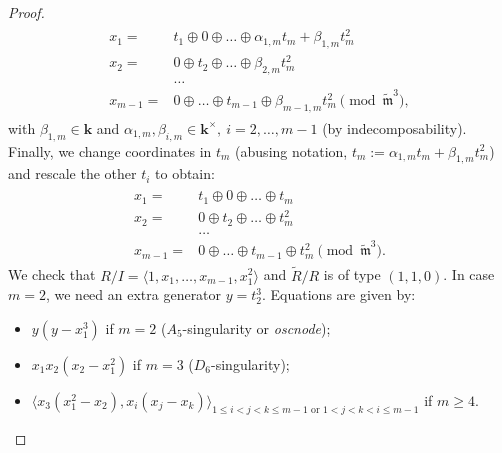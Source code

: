 \documentclass{compositio}
\renewcommand{\k}{\mathbf k}
\newcommand{\tR}{\widetilde{R}}
\newcommand{\tm}{\widetilde{\mathfrak m}}
\theoremstyle{plain}
\theoremstyle{definition}
\theoremstyle{remark}
\begin{document}
\begin{proof}
\begin{align}
 \begin{split}
  x_1= & t_1\oplus0\oplus\ldots\oplus\alpha_{1,m}t_m+\beta_{1,m}t_m^2\\
  x_2= & 0\oplus t_2\oplus\ldots\oplus\beta_{2,m}t_m^2\\
  &\ldots\\
  x_{m-1}= & 0\oplus\ldots\oplus t_{m-1}\oplus \beta_{m-1,m}t_m^2 \pmod{\tm^3},
 \end{split}
 \end{align}
 with $\beta_{1,m}\in\k$ and $\alpha_{1,m},\beta_{i,m}\in\k^\times,\ i=2,\ldots,m-1$ (by indecomposability). Finally, we change coordinates in $t_m$ (abusing notation, $t_m:=\alpha_{1,m}t_m+\beta_{1,m}t_m^2$) and rescale the other $t_i$ to obtain:
 \begin{align}\label{coordII}
 \begin{split}
  x_1= & t_1\oplus0\oplus\ldots\oplus t_m\\
  x_2= & 0\oplus t_2\oplus\ldots\oplus t_m^2\\
  &\ldots\\
  x_{m-1}= & 0\oplus\ldots\oplus t_{m-1}\oplus t_m^2\pmod{\tm^3}.
 \end{split}
 \end{align}
 We check that $R/I=\langle 1,x_1,\ldots,x_{m-1},x_1^2\rangle$ and $\tR/R$ is of type $(1,1,0)$. In case $m=2$, we need an extra generator $y=t_2^3$. Equations are given by:
 \begin{itemize}
  \item $y(y-x_1^3)$ if $m=2$ ($A_5$-singularity or \emph{oscnode});
  \item $x_1x_2(x_2-x_1^2)$ if $m=3$ ($D_6$-singularity);
  \item $\langle x_3(x_1^2-x_2),x_i(x_j-x_k)\rangle_{1\leq i<j<k\leq m-1 \text{ or }1<j<k<i\leq m-1}$ if $m\geq 4$.
 \end{itemize}

 \smallskip
 

\end{proof}
\end{document}
